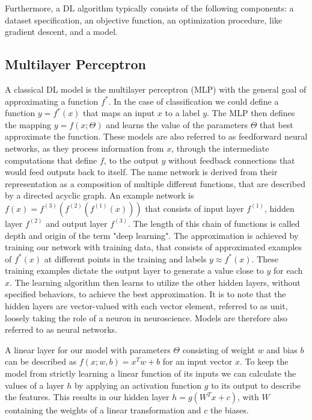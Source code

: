 Furthermore, a DL algorithm typically consists of the following components: a dataset specification, an objective function, an optimization procedure, like gradient descent, and a model. %

\subsection{Multilayer Perceptron}
A classical DL model is the multilayer perceptron (MLP) with the general goal of approximating a function $f^*$. In the case of classification we could define a function $y = f^*(x)$ that maps an input $x$ to a label $y$. The MLP then defines the mapping $y = f(x;\Theta)$ and learns the value of the parameters $\Theta$ that best approximate the function. These models are also referred to as feedforward neural networks, as they process information from $x$, through the intermediate computations that define $f$, to the output $y$ without feedback connections that would feed outputs back to itself. The name network is derived from their representation as a composition of multiple different functions, that are described by a directed acyclic graph. An example network is $f(x) = f^{(3)}(f^{(2)}(f^{(1)}(x)))$ that consists of input layer $f^{(1)}$, hidden layer $f^{(2)}$ and output layer $f^{(3)}$. The length of this chain of functions is called depth and origin of the term "deep learning". The approximation is achieved by training our network with training data, that consists of approximated examples of $f^*(x)$ at different points in the training and labels $y\approx f^*(x)$. These training examples dictate the output layer to generate a value close to $y$ for each $x$. The learning algorithm then learns to utilize the other hidden layers, without specified behaviors, to achieve the best approximation. It is to note that the hidden layers are vector-valued with each vector element, referred to as unit, loosely taking the role of a neuron in neuroscience. Models are therefore also referred to as neural networks.


A linear layer for our model with parameters $\Theta$ consisting of weight $w$ and bias $b$ can be described as $f(x; w,b)=x^Tw+b$ for an input vector $x$. To keep the model from strictly learning a linear function of its inputs we can calculate the values of a layer $h$ by applying an activation function $g$ to its output to describe the features. This results in our hidden layer $h=g(W^Tx+c)$, with $W$ containing the weights of a linear transformation and $c$ the biases.

